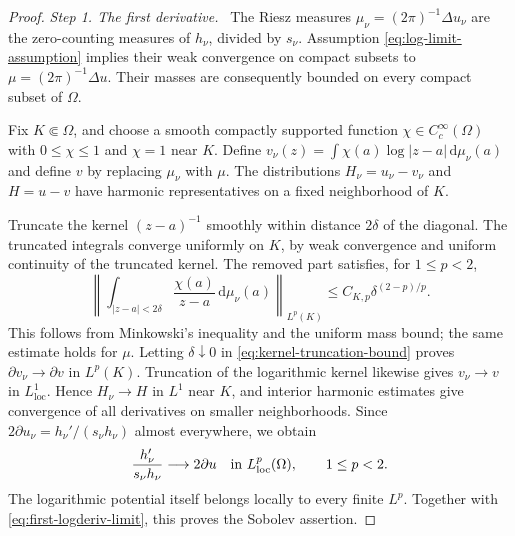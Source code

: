 \documentclass[11pt,letterpaper,reqno]{amsart}
\theoremstyle{remark}
\numberwithin{equation}{section}
\newcommand{\loc}{\mathrm{loc}}
\newcommand{\step}[1]{\medskip\noindent\emph{#1}\ }
\begin{document}
\begin{proof}
\step{Step 1. The first derivative.}
The Riesz measures $\mu_\nu=(2\pi)^{-1}\Delta u_\nu$ are the zero-counting
measures of $h_\nu$, divided by $s_\nu$. Assumption
\eqref{eq:log-limit-assumption} implies their weak convergence on compact
subsets to $\mu=(2\pi)^{-1}\Delta u$. Their masses are consequently bounded
on every compact subset of $\Omega$.

Fix $K\Subset\Omega$, and choose a smooth compactly supported function
$\chi\in C_c^\infty(\Omega)$ with $0\le\chi\le1$ and $\chi=1$ near $K$.
Define $v_\nu(z)=\int\chi(a)\log|z-a|\,\mathrm d\mu_\nu(a)$ and define $v$
by replacing $\mu_\nu$ with $\mu$. The distributions
$H_\nu=u_\nu-v_\nu$ and $H=u-v$ have harmonic representatives on a fixed
neighborhood of $K$.

Truncate the kernel $(z-a)^{-1}$ smoothly within distance $2\delta$ of the
diagonal. The truncated integrals converge uniformly on $K$, by weak
convergence and uniform continuity of the truncated kernel. The removed
part satisfies, for $1\le p<2$,
\begin{equation}\label{eq:kernel-truncation-bound}
 \left\|\int_{|z-a|<2\delta}\frac{\chi(a)}{z-a}
                  \,\mathrm d\mu_\nu(a)\right\|_{L^p(K)}
 \le C_{K,p}\delta^{(2-p)/p}.
\end{equation}
This follows from Minkowski's inequality and the uniform mass bound; the
same estimate holds for $\mu$. Letting $\delta\downarrow0$ in
\eqref{eq:kernel-truncation-bound} proves
$\partial v_\nu\to\partial v$ in $L^p(K)$. Truncation of the logarithmic
kernel likewise gives $v_\nu\to v$ in $L^1_{\loc}$. Hence
$H_\nu\to H$ in $L^1$ near $K$, and interior harmonic estimates give
convergence of all derivatives on smaller neighborhoods. Since
$2\partial u_\nu=h_\nu'/(s_\nu h_\nu)$ almost everywhere, we obtain
\begin{equation}\label{eq:first-logderiv-limit}
 \frac{h_\nu'}{s_\nu h_\nu}\longrightarrow2\partial u
 \quad\hbox{in }L^p_{\loc}(\Omega),\qquad 1\le p<2.
\end{equation}
The logarithmic potential itself belongs locally to every finite $L^p$.
Together with \eqref{eq:first-logderiv-limit}, this proves the Sobolev
assertion.


\end{proof}
\end{document}
